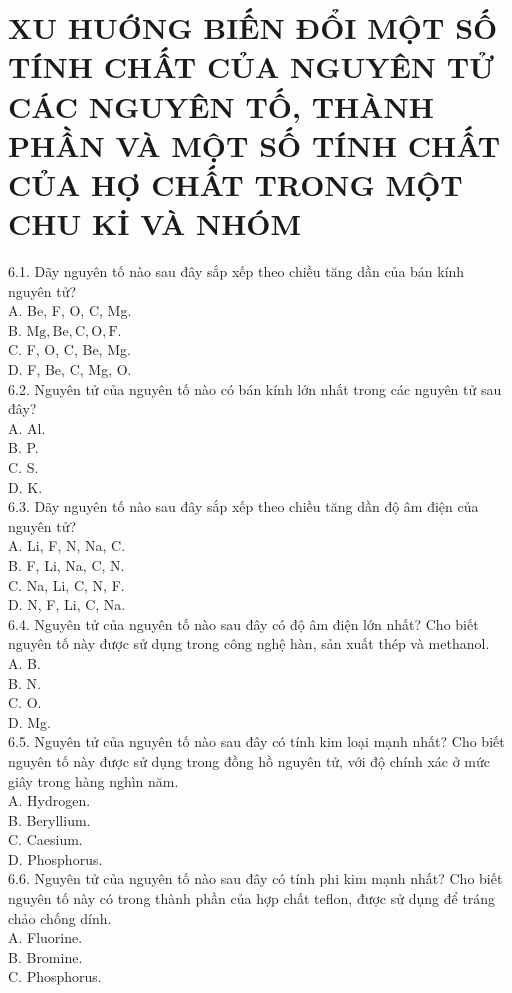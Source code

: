 \documentclass[10pt]{article}
\begin{document}
\section*{XU HUỚNG BIẾN ĐỔI MỘT SỐ TÍNH CHẤT CỦA NGUYÊN TỬ CÁC NGUYÊN TỐ, THÀNH PHẦN VÀ MỘT SỐ TÍNH CHẤT CỦA HỢ CHẤT TRONG MỘT CHU Kİ VÀ NHÓM}
6.1. Dãy nguyên tố nào sau đây sắp xếp theo chiều tăng dần của bán kính nguyên tử?\\
A. Be, F, O, C, Mg.\\
B. $\mathrm{Mg}, \mathrm{Be}, \mathrm{C}, \mathrm{O}, \mathrm{F}$.\\
C. F, O, C, Be, Mg.\\
D. F, Be, C, Mg, O.\\
6.2. Nguyên tử của nguyên tố nào có bán kính lớn nhất trong các nguyên tử sau đây?\\
A. Al.\\
B. P.\\
C. S.\\
D. K.\\
6.3. Dãy nguyên tố nào sau đây sắp xếp theo chiều tăng dần độ âm điện của nguyên tử?\\
A. Li, F, N, Na, C.\\
B. F, Li, Na, C, N.\\
C. Na, Li, C, N, F.\\
D. N, F, Li, C, Na.\\
6.4. Nguyên tử của nguyên tố nào sau đây có độ âm điện lớn nhất? Cho biết nguyên tố này được sử dụng trong công nghệ hàn, sản xuất thép và methanol.\\
A. B.\\
B. N.\\
C. O.\\
D. Mg.\\
6.5. Nguyên tử của nguyên tố nào sau đây có tính kim loại mạnh nhất? Cho biết nguyên tố này được sử dụng trong đồng hồ nguyên tử, với độ chính xác ở mức giây trong hàng nghìn năm.\\
A. Hydrogen.\\
B. Beryllium.\\
C. Caesium.\\
D. Phosphorus.\\
6.6. Nguyên tử của nguyên tố nào sau đây có tính phi kim mạnh nhất? Cho biết nguyên tố này có trong thành phần của hợp chất teflon, được sử dụng để tráng chảo chống dính.\\
A. Fluorine.\\
B. Bromine.\\
C. Phosphorus.\\
\end{document}
